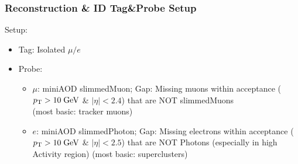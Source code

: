 \documentclass{beamer}
\begin{document}
\begin{frame}
 \frametitle{Reconstruction \& ID Tag\&Probe Setup}
 
 Setup:
 \begin{itemize}
  \item Tag: Isolated $\mu/e$
  \item Probe:
  \begin{itemize}
   \item $\mu$: miniAOD slimmedMuon; Gap: Missing muons within acceptance ($p_{\text{T}}>10\;\text{Ge}\kern-0.06667em\text{V}$ \& $|\eta|<2.4$)  that are NOT slimmedMuons\\ (most basic: tracker muons)
   \item $e$: miniAOD slimmedPhoton; Gap: Missing electrons within acceptance ($p_{\text{T}}>10\;\text{Ge}\kern-0.06667em\text{V}$ \& $|\eta|<2.5$) that are NOT Photons (especially in high Activity region) (most basic: superclusters)
  \end{itemize}
 \end{itemize}
\end{frame}
\end{document}

